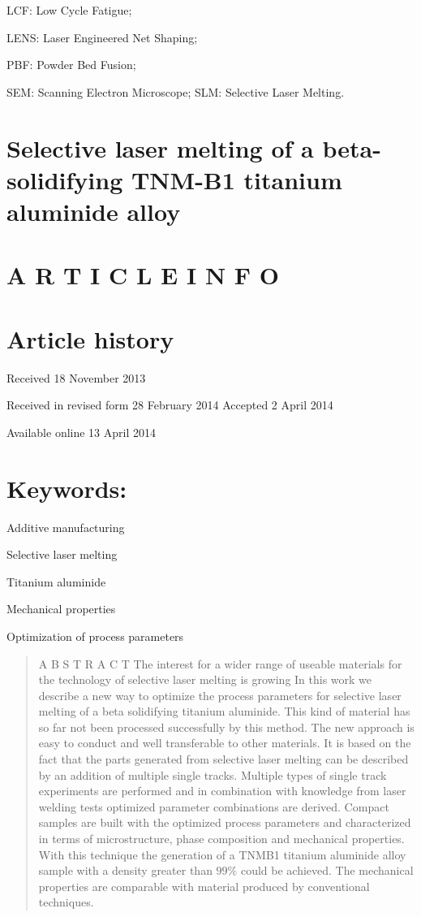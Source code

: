\documentclass[10pt]{article}
\begin{document}
LCF: Low Cycle Fatigue;

LENS: Laser Engineered Net Shaping;

PBF: Powder Bed Fusion;

SEM: Scanning Electron Microscope; SLM: Selective Laser Melting.

\section*{Selective laser melting of a beta-solidifying TNM-B1 titanium aluminide alloy }


\section*{A R T I C L E I N F O}
\section*{Article history}
Received 18 November 2013

Received in revised form 28 February 2014 Accepted 2 April 2014

Available online 13 April 2014

\section*{Keywords:}
Additive manufacturing

Selective laser melting

Titanium aluminide

Mechanical properties

Optimization of process parameters

\begin{abstract}
A B S T R A C T The interest for a wider range of useable materials for the technology of selective laser melting is growing In this work we describe a new way to optimize the process parameters for selective laser melting of a beta solidifying titanium aluminide. This kind of material has so far not been processed successfully by this method. The new approach is easy to conduct and well transferable to other materials. It is based on the fact that the parts generated from selective laser melting can be described by an addition of multiple single tracks. Multiple types of single track experiments are performed and in combination with knowledge from laser welding tests optimized parameter combinations are derived. Compact samples are built with the optimized process parameters and characterized in terms of microstructure, phase composition and mechanical properties. With this technique the generation of a TNMB1 titanium aluminide alloy sample with a density greater than $99 \%$ could be achieved. The mechanical properties are comparable with material produced by conventional techniques.
\end{abstract}
\end{document}
